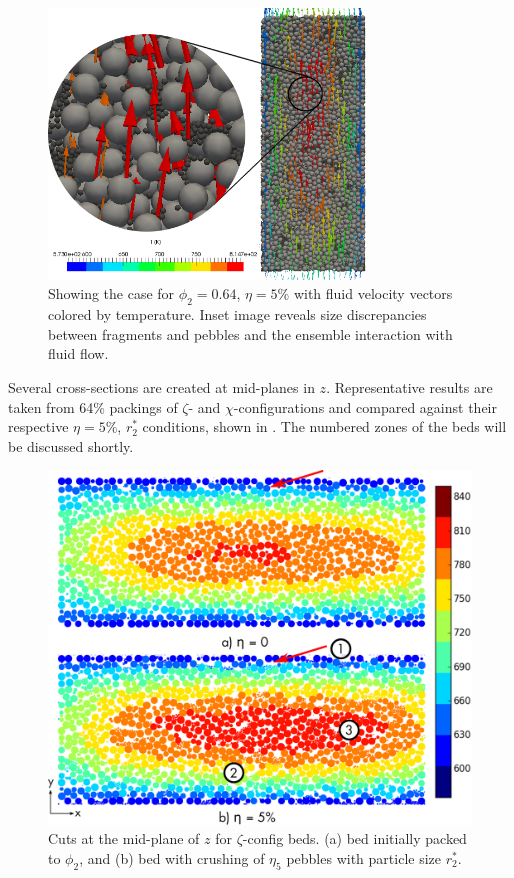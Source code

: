 \begin{figure}[ht]
    \centering
    \includegraphics[width = 0.75\textwidth]{figures/pebble_inset_2.png}
    \caption{Showing the case for $\phi_2 = 0.64$, $\eta = 5\%$ with fluid velocity vectors colored by temperature. Inset image reveals size discrepancies between fragments and pebbles and the ensemble interaction with fluid flow.}\label{fig:inset}
\end{figure}

Several cross-sections are created at mid-planes in $z$. Representative results are taken from 64\% packings of $\zeta$- and $\chi$-configurations and compared against their respective $\eta = 5\%$, $r_2^*$ conditions, shown in . The numbered zones of the beds will be discussed shortly.

\begin{figure}[!ht]
    \centering
    \includegraphics[width = \textwidth]{figures/z-64-discrete.eps}
    \caption{Cuts at the mid-plane of $z$ for $\zeta$-config beds. (a) bed initially packed to $\phi_2$, and (b) bed with crushing of $\eta_5$ pebbles with particle size $r_2^*$.}\label{fig:1}
\end{figure}

